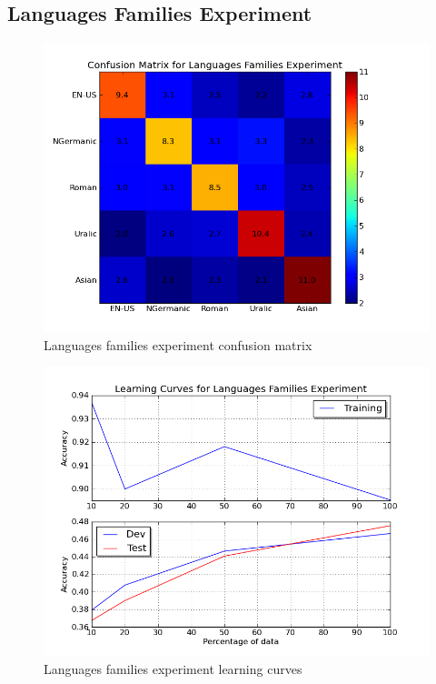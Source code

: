 \documentclass[11pt]{article}
\begin{document}
\subsection{Languages Families Experiment}
\begin{figure}[htp]
\centering
\includegraphics[scale=0.45]{family_cfm.png}
\caption{Languages families experiment confusion matrix}
\label{fam_cfm}
\end{figure}

\begin{figure}[htp]
\centering
\includegraphics[scale=0.45]{family_lc.png}
\caption{Languages families experiment learning curves}
\label{fam_lc}
\end{figure}
\end{document}
